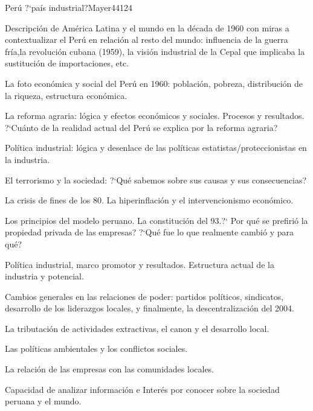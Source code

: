 \begin{syllabus}
\begin{unit}{Perú ?`país industrial?}{}{Mayer44}{12}{4}
   \begin{topics}
      \item Descripción de América Latina y el mundo en la década de 1960 con miras a contextualizar el Perú en relación al resto del mundo: influencia de la guerra fría,la revolución cubana (1959), la visión industrial de la Cepal que implicaba la sustitución de importaciones, etc.
      \item La foto económica y social del Perú en 1960: población, pobreza, distribución de la riqueza, estructura económica.
      \item La reforma agraria: lógica y efectos económicos y sociales. Procesos y resultados. ?`Cuánto de la realidad actual del Perú se explica por la reforma agraria?
      \item Política industrial: lógica y desenlace de las políticas estatistas/proteccionistas en la industria.
      \item El terrorismo y la sociedad: ?`Qué sabemos sobre sus causas y sus consecuencias?
      \item La crisis de fines de los 80. La hiperinflación y el intervencionismo económico.
      \item Los principios del modelo peruano. La constitución del 93.?` Por qué se prefirió la propiedad privada de las empresas? ?`Qué fue lo que realmente cambió y para qué?
      \item Política industrial, marco promotor y resultados. Estructura actual de la industria y potencial.
      \item Cambios generales en las relaciones de poder: partidos políticos, sindicatos, desarrollo de los liderazgos locales, y finalmente, la descentralización del 2004.
      \item La tributación de actividades extractivas, el canon y el desarrollo local.
      \item Las políticas ambientales y los conflictos sociales.
      \item La relación de las empresas con las comunidades locales.
   \end{topics}
   \begin{learningoutcomes}
      \item Capacidad de analizar información e Interés por conocer sobre la sociedad peruana y el mundo.
   \end{learningoutcomes}
\end{unit}

\begin{coursebibliography}
\end{coursebibliography}

\end{syllabus}
